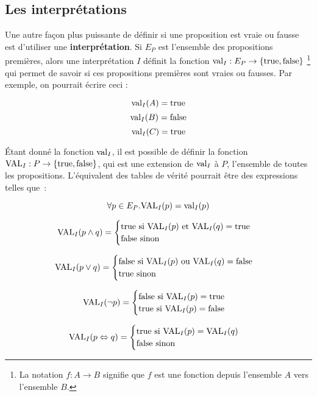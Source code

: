 \subsection{Les interprétations}

Une autre façon plus puissante de définir si une proposition est vraie ou fausse est d’utiliser
une \textbf{interprétation}. Si $E_P$ est l’ensemble des propositions premières,
alors une interprétation $I$ définit la fonction $\mathrm{val}_I : E_P \rightarrow
\{\mathrm{true}, \mathrm{false}\}$ \footnote{La notation $f : A \rightarrow B$ signifie que $f$
  est une fonction depuis l’ensemble $A$ vers l’ensemble $B$.  } qui permet de
savoir si ces propositions premières sont vraies ou fausses. Par exemple, on
pourrait écrire ceci :

\[\mathrm{val}_I(A) = \mathrm{true}\]
\[\mathrm{val}_I(B) = \mathrm{false}\]
\[\mathrm{val}_I(C) = \mathrm{true}\]

Étant donné la fonction $\mathrm{val}_I$, il est possible de définir la fonction
$\mathrm{VAL}_I : P \rightarrow \{\mathrm{true}, \mathrm{false}\}$, qui est une extension de
$\mathrm{val}_I$ à $P$, l’ensemble de toutes les propositions. L’équivalent des
tables de vérité pourrait être des expressions telles que~:

\[\forall p \in E_P. \mathrm{VAL}_I(p) = \mathrm{val}_I(p)\]

\[\mathrm{VAL}_I(p \land q) = \begin{cases}
  \mathrm{true} \mbox{ si } \mathrm{VAL}_I(p) \mbox{ et } \mathrm{VAL}_I(q) = \mathrm{true} \\
  \mathrm{false}\mbox{ sinon}
\end{cases}\]

\[\mathrm{VAL}_I(p \lor q) = \begin{cases}
  \mathrm{false} \mbox{ si } \mathrm{VAL}_I(p) \mbox{ ou } \mathrm{VAL}_I(q) = \mathrm{false} \\
  \mathrm{true}\mbox{ sinon}
\end{cases}\]

\[\mathrm{VAL}_I(\lnot p) = \begin{cases}
  \mathrm{false}\mbox{ si }\mathrm{VAL}_I(p) = \mathrm{true} \\
  \mathrm{true}\mbox{ si }\mathrm{VAL}_I(p) = \mathrm{false}
\end{cases}\]

\[\mathrm{VAL}_I(p \Leftrightarrow q) = \begin{cases}
  \mathrm{true}\mbox{ si }\mathrm{VAL}_I(p) = \mathrm{VAL}_I(q) \\
  \mathrm{false}\mbox{ sinon}
\end{cases}\]

